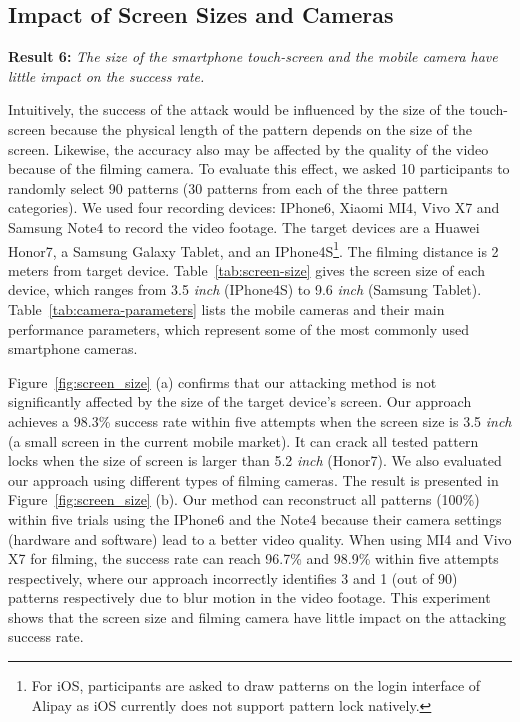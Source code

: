     \subsection{Impact of Screen Sizes and Cameras}
    \label{section: screen-size and cameras}
    \noindent \textbf{Result 6:} \emph{The size of the smartphone touch-screen and the mobile camera have little impact on the success rate.}

    Intuitively, the success of the attack would be influenced by the size of
    the touch-screen because the physical length of the pattern depends on
    the size of the screen. Likewise, the accuracy also may be affected by
    the quality of the video because of the filming camera. To evaluate this
    effect, we asked 10 participants to randomly select 90 patterns (30
    patterns from each of the three pattern categories). We used four
    recording devices: IPhone6, Xiaomi MI4, Vivo X7 and Samsung Note4 to
    record the video footage. The target devices are a Huawei Honor7, a
    Samsung Galaxy Tablet, and an IPhone4S\footnote{For iOS, participants are asked
    to draw  patterns on the login interface of Alipay as iOS
    currently does not support pattern lock natively.}. The filming distance is 2
    meters from target device. Table~\ref{tab:screen-size} gives the screen
    size of each device, which ranges from 3.5 \emph{inch} (IPhone4S) to
    9.6 \emph{inch} (Samsung Tablet). Table~\ref{tab:camera-parameters} lists
    the mobile cameras and their main performance parameters, which
    represent some of the most commonly used smartphone cameras.

    Figure~\ref{fig:screen_size} (a) confirms that our attacking method
    is not significantly affected by the size of the
     target device's screen. Our approach achieves a 98.3\%  success rate within five
    attempts when the screen size is 3.5 \emph{inch} (a small screen in the current
     mobile market). It can crack all tested pattern locks when
    the size of screen is larger than 5.2 \emph{inch} (Honor7). We also
    evaluated  our approach using different types of filming cameras.
    The result is presented in Figure~\ref{fig:screen_size}
    (b). Our method can reconstruct all patterns (100\%) within five trials using
    the IPhone6 and the Note4 because their camera settings (hardware and software) lead to a better video
    quality.   When using MI4 and Vivo X7 for filming,
     the success rate can reach 96.7\% and 98.9\% within five
    attempts respectively, where our approach incorrectly identifies 3 and 1 (out of
    90) patterns respectively due to blur motion in the video footage.
    This experiment shows that the screen size and filming camera
    have little impact on the attacking success rate.



